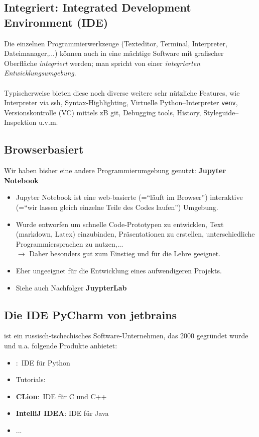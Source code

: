 \subsection{Integriert: Integrated Development Environment (IDE)}
Die einzelnen Programmierwerkzeuge (Texteditor, Terminal, Interpreter, Dateimanager,...) können auch in eine mächtige Software mit grafischer Oberfläche \textit{integriert} werden; man spricht von einer \textit{integrierten Entwicklungsumgebung}.\\~\\
Typischerweise bieten diese noch diverse weitere sehr nützliche Features, wie Interpreter via ssh, Syntax-Highlighting, Virtuelle Python--Interpreter \texttt{venv}, Versionskontrolle (VC) mittels zB git, Debugging tools, History, Styleguide--Inspektion u.v.m.\\




\subsection{Browserbasiert}
Wir haben bisher eine andere Programmierumgebung genutzt: \textbf{Jupyter Notebook}
\begin{itemize}
	\item Jupyter Notebook ist eine web-basierte (=``läuft im Browser'') interaktive (=``wir lassen gleich einzelne Teile des Codes laufen'') Umgebung.
	\item Wurde entworfen um schnelle Code-Prototypen zu entwicklen, Text (markdown, Latex) einzubinden, Präsentationen zu erstellen, unterschiedliche Programmiersprachen zu nutzen,...\\
	$\to$ Daher besonders gut zum Einstieg und für die Lehre geeignet.
	\item Eher ungeeignet für die Entwicklung eines aufwendigeren Projekts.
	\item Siehe auch Nachfolger \textbf{JuypterLab}
\end{itemize}


\subsection{Die IDE PyCharm von jetbrains}
 ist ein russisch-tschechisches Software-Unternehmen, das 2000 gegründet wurde und u.a. folgende Produkte anbietet:
\begin{itemize}
	\item \textbf{\pycharm}:~IDE für Python
	\item Tutorials: 
	\item \textbf{CLion}:~IDE für C und C++
	\item \textbf{IntelliJ IDEA}: IDE für Java
	\item ...
\end{itemize}


